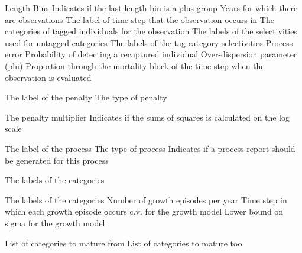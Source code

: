 \par\textbf{}\par
{} {Length Bins}
 {Indicates if the last length bin is a plus group}
 {Years for which there are observations}
 {The label of time-step that the observation occurs in}
 {The categories of tagged individuals for the observation}
 {The labels of the selectivities used for untagged categories}
 {The labels of the tag category selectivities}
 {Process error}
 {Probability of detecting a recaptured individual}
 {Over-dispersion parameter (phi)}
 {Proportion through the mortality block of the time step when the observation is evaluated}
\par\par
{} {The label of the penalty}
 {The type of penalty}
\par\textbf{}\par
{} {The penalty multiplier}
 {Indicates if the sums of squares is calculated on the log scale}
\par\par
{} {The label of the process}
 {The type of process}
 {Indicates if a process report should be generated for this process}
\par\textbf{}\par
{} {The labels of the categories}
\par\textbf{}\par
{} {The labels of the categories}
 {Number of growth episodes per year}
 {Time step in which each growth episode occurs}
 {c.v. for the growth model}
 {Lower bound on sigma for the growth model}
\par\textbf{}\par
{} {List of categories to mature from}
 {List of categories to mature too}
